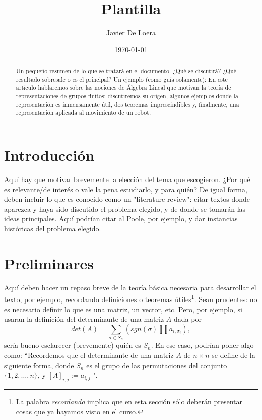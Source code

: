 \documentclass[letterpaper,12pt]{article}
\begin{document}
\title{Plantilla} %
\author{Javier De Loera} %
\date{\today} %

\maketitle

\begin{abstract}
Un pequeño resumen de lo que se tratará en el documento. ¿Qué se discutirá? ¿Qué resultado sobresale o es el principal? Un ejemplo (como guía solamente): En este artículo hablaremos sobre las nociones de Álgebra Lineal que motivan la teoría de representaciones de grupos finitos; discutiremos su origen, algunos ejemplos donde la representación es inmensamente útil, dos teoremas imprescindibles y, finalmente, una representación aplicada al movimiento de un robot.
\end{abstract}


\section{Introducción}

Aquí hay que motivar brevemente la elección del tema que escogieron. ¿Por qué es relevante/de interés o vale la pena estudiarlo, y para quién? De igual forma, deben incluir lo que es conocido como un "literature review": citar textos donde aparezca y haya sido discutido el problema elegido, y de donde se tomarán las ideas principales. Aquí podrían citar al Poole, por ejemplo, y dar instancias históricas del problema elegido.


\section{Preliminares}

Aquí deben hacer un repaso breve de la teoría básica necesaria para desarrollar el texto, por ejemplo, recordando definiciones o teoremas útiles\footnote{La palabra \emph{recordando} implica que en esta sección sólo deberán presentar cosas que ya hayamos visto en el curso.}. Sean prudentes: no es necesario definir lo que es una matriz, un vector, etc. Pero, por ejemplo, si usaran la definición del determinante de una matriz $A$ dada por 
\[
    det(A) = \sum_{\sigma \in S_n} (sgn(\sigma)\prod{a_{i,\sigma_i}}),
\]
sería bueno esclarecer (brevemente) quién es $S_n$. En ese caso, podrían poner algo como: ``Recordemos que el determinante de una matriz $A$ de $n\times n$ se define de la siguiente forma, donde $S_n$ es el grupo de las permutaciones del conjunto $\{1, 2, \dots, n\}$, y $[A]_{i,j} := a_{i,j}$ \cite{Poole}". 
\end{document}
